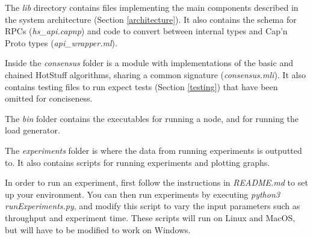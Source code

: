The \textit{lib} directory contains files implementing the main components described in the system architecture (Section \ref{architecture}). It also contains the schema for RPCs (\textit{hs\_api.capnp}) and code to convert between internal types and Cap'n Proto types (\textit{api\_wrapper.ml}).

Inside the \textit{consensus} folder is a module with implementations of the basic and chained HotStuff algorithms, sharing a common signature (\textit{consensus.mli}). It also contains testing files to run expect tests (Section \ref{testing}) that have been omitted for conciseness.

The \textit{bin} folder contains the executables for running a node, and for running the load generator.

The \textit{experiments} folder is where the data from running experiments is outputted to. It also contains scripts for running experiments and plotting graphs.

In order to run an experiment, first follow the instructions in \textit{README.md} to set up your environment. You can then run experiments by executing \textit{python3 runExperiments.py}, and modify this script to vary the input parameters such as throughput and experiment time. These scripts will run on Linux and MacOS, but will have to be modified to work on Windows.